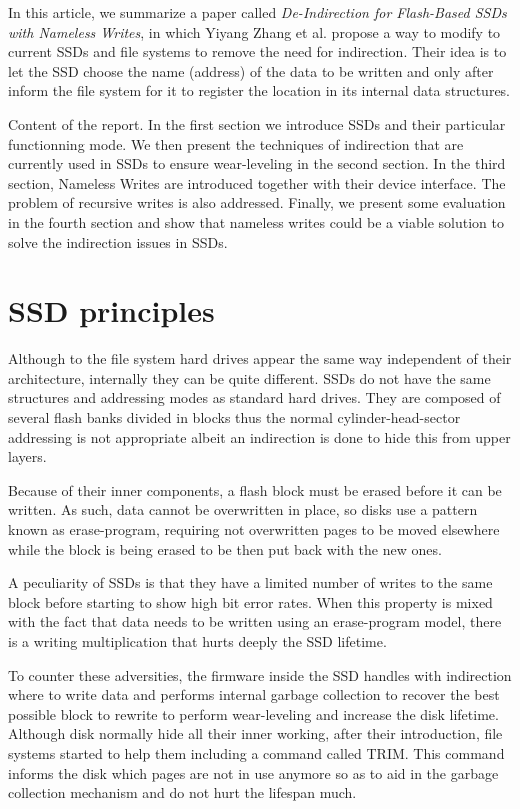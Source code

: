 \documentclass[twocolumn,a4paper,10pt]{article}
\begin{document}
In this article, we summarize a paper called \textit{De-Indirection for
	Flash-Based SSDs with Nameless Writes}, in which Yiyang Zhang et al.
propose a way to modify to current SSDs and file systems to remove the need
for indirection. Their idea is to let the SSD choose the name (address) of the
data to be written and only after inform the file system for it to register
the location in its internal data structures.

Content of the report. In the first section we introduce SSDs and their
particular functionning mode. We then present the techniques of indirection
that are currently used in SSDs to ensure wear-leveling in the second section.
In the third section, Nameless Writes are introduced together with their
device interface. The problem of recursive writes is also addressed.
Finally, we present some evaluation in the fourth section and show that
nameless writes could be a viable solution to solve the indirection issues
in SSDs.

\section*{SSD principles}
Although to the file system hard drives appear the same way independent of
their architecture, internally they can be quite different. SSDs do not have
the same structures and addressing modes as standard hard drives. They are
composed of several flash banks divided in blocks thus the normal
cylinder-head-sector addressing is not appropriate albeit an indirection is
done to hide this from upper layers.

Because of their inner components, a flash block must be erased before it can
be written. As such, data cannot be overwritten in place, so disks use a
pattern known as erase-program, requiring not overwritten pages to be moved
elsewhere while the block is being erased to be then put back with the new
ones.

A peculiarity of SSDs is that they have a limited number of writes to the same
block before starting to show high bit error rates. When this property is
mixed with the fact that data needs to be written using an erase-program
model, there is a writing multiplication that hurts deeply the SSD lifetime.

To counter these adversities, the firmware inside the SSD handles with
indirection where to write data and performs internal garbage collection to
recover the best possible block to rewrite to perform wear-leveling and
increase the disk lifetime. Although disk normally hide all their inner
working, after their introduction, file systems started to help them
including a command called TRIM. This command informs the disk which pages are
not in use anymore so as to aid in the garbage collection mechanism and do not
hurt the lifespan much.
\end{document}
